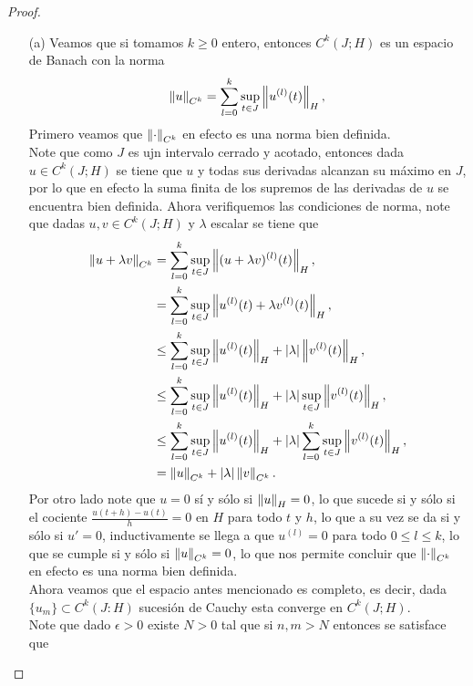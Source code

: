 \begin{proof} 
  \begin{enumerate}
    \item[(a)] Veamos que si tomamos $k\geq 0$ entero, entonces $C^{k}(J;H)$ es un espacio de Banach con la norma
      \begin{align*}
        \left\|u\right\|_{C^{k}}=\sum_{l=0}^{k}\sup_{t\in J}\left\|u^{(l)}(t)\right\|_{H},
      \end{align*}
      Primero veamos que $\left\|\cdot\right\|_{C^{k}}$ en efecto es una norma bien definida.\\
      Note que como $J$ es ujn intervalo cerrado y acotado, entonces dada $u\in C^{k}(J;H)$ se tiene que $u$ y todas sus derivadas alcanzan su máximo en $J$, por lo que en efecto la suma finita de los supremos de las derivadas de $u$ se encuentra bien definida.
      Ahora verifiquemos las condiciones de norma, note que dadas $u,v\in C^{k}(J;H)$ y $\lambda$ escalar se tiene que
      \begin{align*}
        \left\|u+\lambda v\right\|_{C^{k}}&=\sum_{l=0}^{k}\sup_{t\in J}\left\|(u+\lambda v)^{(l)}(t)\right\|_{H},\\
        &=\sum_{l=0}^{k}\sup_{t\in J}\left\|u^{(l)}(t)+\lambda v^{(l)}(t)\right\|_{H},\\
        &\leq\sum_{l=0}^{k}\sup_{t\in J}\left\|u^{(l)}(t)\right\|_{H}+|\lambda| \left\|v^{(l)}(t)\right\|_{H},\\
        &\leq\sum_{l=0}^{k}\sup_{t\in J}\left\|u^{(l)}(t)\right\|_{H}+|\lambda|\sup_{t\in J} \left\|v^{(l)}(t)\right\|_{H},\\
        &\leq\sum_{l=0}^{k}\sup_{t\in J}\left\|u^{(l)}(t)\right\|_{H}+|\lambda|\sum_{l=0}^{k}\sup_{t\in J} \left\|v^{(l)}(t)\right\|_{H},\\
        &=\left\|u\right\|_{C^{k}}+|\lambda|\left\|v\right\|_{C^{k}}.
      \end{align*}
      Por otro lado note que $u=0$ sí y sólo si $\left\|u\right\|_{H}=0$, lo que sucede si y sólo si el cociente $\frac{u(t+h)-u(t)}{h}=0$ en $H$ para todo $t$ y $h$, lo que a su vez se da si y sólo si $u'=0$, inductivamente se llega a que $u^{(l)}=0$ para todo $0\leq l\leq k$, lo que se cumple si y sólo si $\left\|u\right\|_{C^{k}}=0$, lo que nos permite concluir que $\left\|\cdot\right\|_{C^{k}}$ en efecto es una norma bien definida.\\
      Ahora veamos que el espacio antes mencionado es completo, es decir, dada $\{u_{m}\}\subset C^{k}(J:H)$ sucesión de Cauchy esta converge en $C^{k}(J;H)$.\\
      Note que dado $\epsilon>0$ existe $N>0$ tal que si $n,m>N$ entonces se satisface que

\end{enumerate}
\end{proof}
